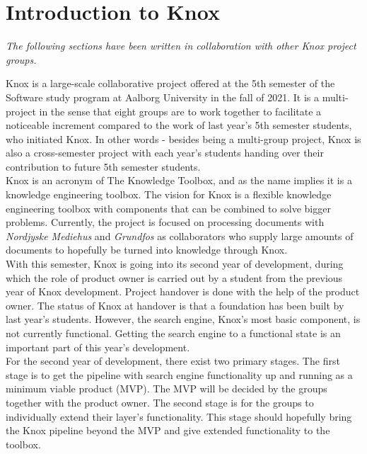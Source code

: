\chapter{Introduction to Knox}\label{introduction_to_knox}
\textit{The following sections have been written in collaboration with other Knox project groups.}

Knox is a large-scale collaborative project offered at the 5th semester of the Software study program at Aalborg University in the fall of 2021. It is a multi-project in the sense that eight groups are to work together to facilitate a noticeable increment compared to the work of last year's 5th semester students, who initiated Knox. In other words - besides being a multi-group project, Knox is also a cross-semester project with each year's students handing over their contribution to future 5th semester students.\\

Knox is an acronym of The Knowledge Toolbox, and as the name implies it is a knowledge engineering toolbox. The vision for Knox is a flexible knowledge engineering toolbox with components that can be combined to solve bigger problems. Currently, the project is focused on processing documents with \textit{Nordjyske Mediehus} and \textit{Grundfos} as collaborators who supply large amounts of documents to hopefully be turned into knowledge through Knox.\\

With this semester, Knox is going into its second year of development, during which the role of product owner is carried out by a student from the previous year of Knox development. Project handover is done with the help of the product owner. The status of Knox at handover is that a foundation has been built by last year's students.
However, the search engine, Knox's most basic component, is not currently functional. Getting the search engine to a functional state is an important part of this year's development.\\

For the second year of development, there exist two primary stages.
The first stage is to get the pipeline with search engine functionality up and running as a minimum viable product (MVP). The MVP will be decided by the groups together with the product owner. The second stage is for the groups to individually extend their layer's functionality. This stage should hopefully bring the Knox pipeline beyond the MVP and give extended functionality to the toolbox.\\

